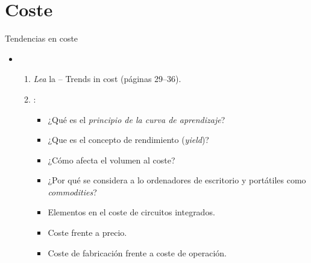 \section{Coste}

\begin{frame}[t]{Tendencias en coste}
\begin{itemize}
  \item {}
    \begin{enumerate}
      \item \emph{Lea} la  -- Trends in cost (páginas 29--36).\\
            \bibhennessy

      \item {}:
        \begin{itemize}
          \item ¿Qué es el \emph{principio de la curva de aprendizaje}?
          \item ¿Que es el concepto de rendimiento (\emph{yield})?
          \item ¿Cómo afecta el volumen al coste?
          \item ¿Por qué se considera a lo ordenadores de escritorio y portátiles como
                \emph{commodities}?
          \item Elementos en el coste de circuitos integrados.
          \item Coste frente a precio.
          \item Coste de fabricación frente a coste de operación.
        \end{itemize}
    \end{enumerate}
\end{itemize}
\end{frame}
